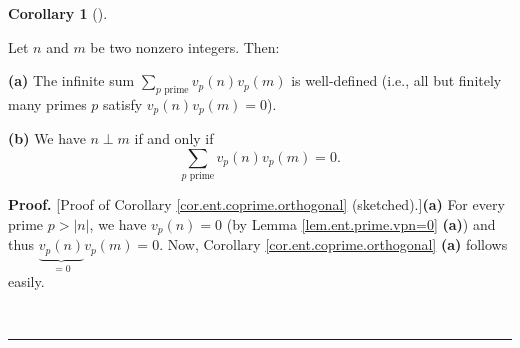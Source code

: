 \documentclass[numbers=enddot,12pt,final,onecolumn,notitlepage]{scrartcl}%
\numberwithin{exer}{subsection}
\theoremstyle{definition}
\newtheorem{coro}[theo]{Corollary}
\newenvironment{corollary}[1][]
{\begin{coro}[#1]\begin{leftbar}}
{\end{leftbar}\end{coro}}
\newenvironment{proof}[1][Proof]{\noindent\textbf{#1.} }{\ \rule{0.5em}{0.5em}}
\let\sumnonlimits\sum
\renewcommand{\sum}{\sumnonlimits\limits}
\begin{document}
\begin{corollary}
\label{cor.ent.coprime.orthogonal}Let $n$ and $m$ be two nonzero integers. Then:

\textbf{(a)} The infinite sum $\sum_{p\text{ prime}}v_{p}\left(  n\right)
v_{p}\left(  m\right)  $ is well-defined (i.e., all but finitely many primes
$p$ satisfy $v_{p}\left(  n\right)  v_{p}\left(  m\right)  =0$).

\textbf{(b)} We have $n\perp m$ if and only if
\[
\sum_{p\text{ prime}}v_{p}\left(  n\right)  v_{p}\left(  m\right)  =0.
\]

\end{corollary}

\begin{proof}
[Proof of Corollary \ref{cor.ent.coprime.orthogonal} (sketched).]\textbf{(a)}
For every prime $p>\left\vert n\right\vert $, we have $v_{p}\left(  n\right)
=0$ (by Lemma \ref{lem.ent.prime.vpn=0} \textbf{(a)}) and thus
$\underbrace{v_{p}\left(  n\right)  }_{=0}v_{p}\left(  m\right)  =0$. Now,
Corollary \ref{cor.ent.coprime.orthogonal} \textbf{(a)} follows easily.


\end{proof}
\end{document}
